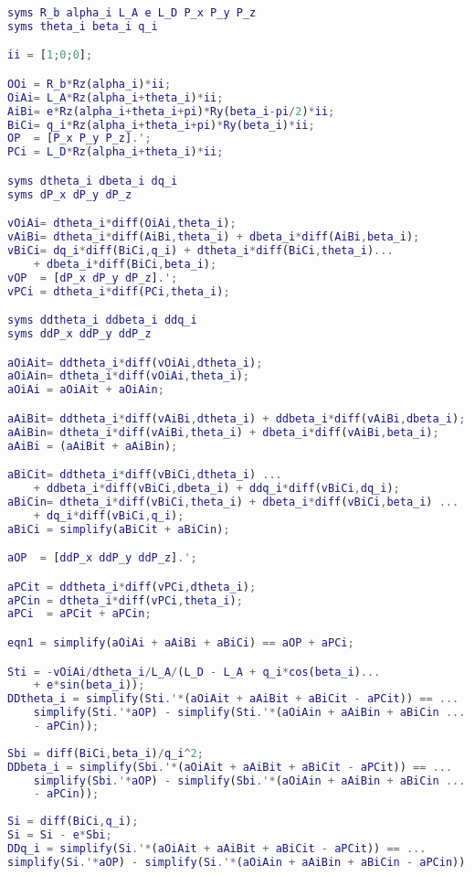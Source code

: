 \begin{lstlisting}[frame=single,language = matlab]
syms R_b alpha_i L_A e L_D P_x P_y P_z
syms theta_i beta_i q_i

ii = [1;0;0];

OOi = R_b*Rz(alpha_i)*ii;
OiAi= L_A*Rz(alpha_i+theta_i)*ii;
AiBi= e*Rz(alpha_i+theta_i+pi)*Ry(beta_i-pi/2)*ii;
BiCi= q_i*Rz(alpha_i+theta_i+pi)*Ry(beta_i)*ii;
OP  = [P_x P_y P_z].';
PCi = L_D*Rz(alpha_i+theta_i)*ii;

syms dtheta_i dbeta_i dq_i
syms dP_x dP_y dP_z

vOiAi= dtheta_i*diff(OiAi,theta_i);
vAiBi= dtheta_i*diff(AiBi,theta_i) + dbeta_i*diff(AiBi,beta_i);
vBiCi= dq_i*diff(BiCi,q_i) + dtheta_i*diff(BiCi,theta_i)...
    + dbeta_i*diff(BiCi,beta_i);
vOP  = [dP_x dP_y dP_z].';
vPCi = dtheta_i*diff(PCi,theta_i);

syms ddtheta_i ddbeta_i ddq_i
syms ddP_x ddP_y ddP_z

aOiAit= ddtheta_i*diff(vOiAi,dtheta_i);
aOiAin= dtheta_i*diff(vOiAi,theta_i);
aOiAi = aOiAit + aOiAin;

aAiBit= ddtheta_i*diff(vAiBi,dtheta_i) + ddbeta_i*diff(vAiBi,dbeta_i);
aAiBin= dtheta_i*diff(vAiBi,theta_i) + dbeta_i*diff(vAiBi,beta_i);
aAiBi = (aAiBit + aAiBin);

aBiCit= ddtheta_i*diff(vBiCi,dtheta_i) ... 
    + ddbeta_i*diff(vBiCi,dbeta_i) + ddq_i*diff(vBiCi,dq_i);
aBiCin= dtheta_i*diff(vBiCi,theta_i) + dbeta_i*diff(vBiCi,beta_i) ...
    + dq_i*diff(vBiCi,q_i);
aBiCi = simplify(aBiCit + aBiCin);

aOP  = [ddP_x ddP_y ddP_z].';

aPCit = ddtheta_i*diff(vPCi,dtheta_i);
aPCin = dtheta_i*diff(vPCi,theta_i);
aPCi  = aPCit + aPCin;

eqn1 = simplify(aOiAi + aAiBi + aBiCi) == aOP + aPCi;

Sti = -vOiAi/dtheta_i/L_A/(L_D - L_A + q_i*cos(beta_i)...
    + e*sin(beta_i));
DDtheta_i = simplify(Sti.'*(aOiAit + aAiBit + aBiCit - aPCit)) == ... 
    simplify(Sti.'*aOP) - simplify(Sti.'*(aOiAin + aAiBin + aBiCin ...
    - aPCin));
    
Sbi = diff(BiCi,beta_i)/q_i^2;
DDbeta_i = simplify(Sbi.'*(aOiAit + aAiBit + aBiCit - aPCit)) == ... 
    simplify(Sbi.'*aOP) - simplify(Sbi.'*(aOiAin + aAiBin + aBiCin ...
    - aPCin));
    
Si = diff(BiCi,q_i);
Si = Si - e*Sbi;
DDq_i = simplify(Si.'*(aOiAit + aAiBit + aBiCit - aPCit)) == ...
simplify(Si.'*aOP) - simplify(Si.'*(aOiAin + aAiBin + aBiCin - aPCin));
\end{lstlisting}